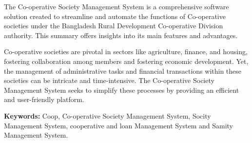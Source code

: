 The Co-operative Society Management System is a comprehensive software solution created to streamline and automate the functions of Co-operative societies under the Bangladesh Rural Development Co-operative Division authority. This summary offers insights into its main features and advantages.

Co-operative societies are pivotal in sectors like agriculture, finance, and housing, fostering collaboration among members and fostering economic development. Yet, the management of administrative tasks and financial transactions within these societies can be intricate and time-intensive. The Co-operative Society Management System seeks to simplify these processes by providing an efficient and user-friendly platform.






\vspace{8pt}
\textbf{Keywords:} Coop, Co-operative Society Management System, Socity Management System, cooperative and loan Management System and Samity Management System.

